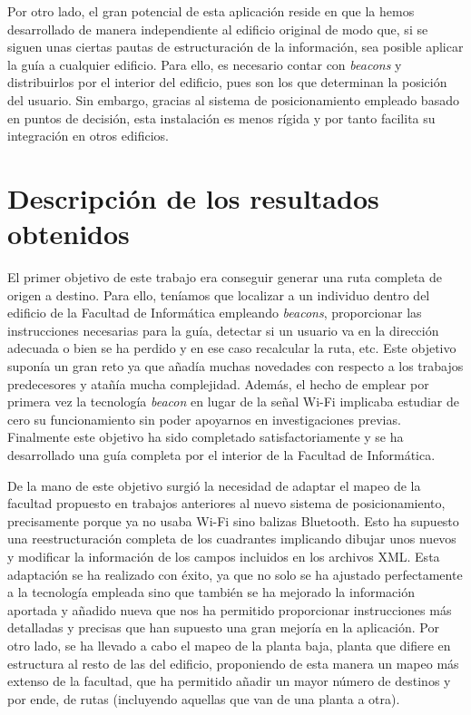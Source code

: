 Por otro lado, el gran potencial de esta aplicación reside en que la hemos desarrollado de manera independiente al edificio original de modo que, si se siguen unas ciertas pautas de estructuración de la información, sea posible aplicar la guía a cualquier edificio. Para ello, es necesario contar con \textit{beacons} y distribuirlos por el interior del edificio, pues son los que determinan la posición del usuario. Sin embargo, gracias al sistema de posicionamiento empleado basado en puntos de decisión, esta instalación es menos rígida y por tanto facilita su integración en otros edificios. 

\section{Descripción de los resultados obtenidos}
\label{sec:descResult}
El primer objetivo de este trabajo era conseguir generar una ruta completa de origen a destino. Para ello, teníamos que localizar a un individuo dentro del edificio de la Facultad de Informática empleando \textit{beacons}, proporcionar las instrucciones necesarias para la guía, detectar si un usuario va en la dirección adecuada o bien se ha perdido y en ese caso recalcular la ruta, etc. Este objetivo suponía un gran reto ya que añadía muchas novedades con respecto a los trabajos predecesores y atañía mucha complejidad. Además, el hecho de emplear por primera vez la tecnología \textit{beacon} en lugar de la señal Wi-Fi implicaba estudiar de cero su funcionamiento sin poder apoyarnos en investigaciones previas. Finalmente este objetivo ha sido completado satisfactoriamente y se ha desarrollado una guía completa por el interior de la Facultad de Informática.

De la mano de este objetivo surgió la necesidad de adaptar el mapeo de la facultad propuesto en trabajos anteriores al nuevo sistema de posicionamiento, precisamente porque ya no usaba Wi-Fi sino balizas Bluetooth. Esto ha supuesto una reestructuración completa de los cuadrantes implicando dibujar unos nuevos y modificar la información de los campos incluidos en los archivos XML. Esta adaptación se ha realizado con éxito, ya que no solo se ha ajustado perfectamente a la tecnología empleada sino que también se ha mejorado la información aportada y añadido nueva que nos ha permitido proporcionar instrucciones más detalladas y precisas que han supuesto una gran mejoría en la aplicación. Por otro lado, se ha llevado a cabo el mapeo de la planta baja, planta que difiere en estructura al resto de las del edificio, proponiendo de esta manera un mapeo más extenso de la facultad, que ha permitido añadir un mayor número de destinos y por ende, de rutas (incluyendo aquellas que van de una planta a otra).

